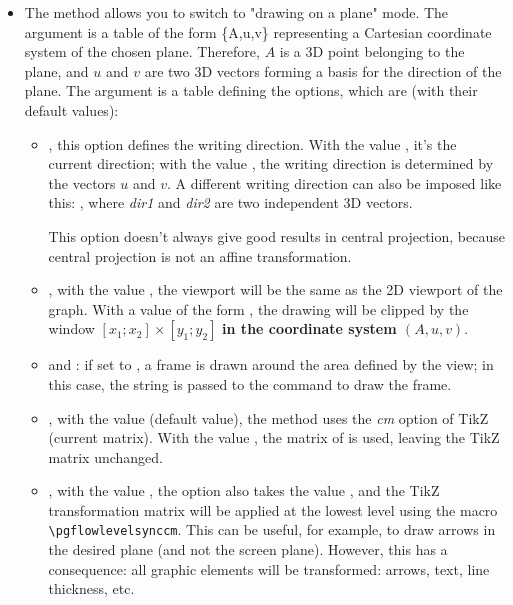 \begin{itemize}
    \item The method  allows you to switch to "drawing on a plane" mode. The argument  is a table of the form \{A,u,v\} representing a Cartesian coordinate system of the chosen plane. Therefore, $A$ is a 3D point belonging to the plane, and $u$ and $v$ are two 3D vectors forming a basis for the direction of the plane. The argument  is a table defining the options, which are (with their default values):
    \begin{itemize}
        \item {}, this option defines the writing direction. With the value \nil, it's the current direction; with the value , the writing direction is determined by the vectors $u$ and $v$. A different writing direction can also be imposed like this: , where \emph{dir1} and \emph{dir2} are two independent 3D vectors.

        This option doesn't always give good results in central projection, because central projection is not an affine transformation.

        \item {}, with the value \nil, the viewport will be the same as the 2D viewport of the graph. With a value of the form , the drawing will be clipped by the window $[x_1;x_2]\times[y_1;y_2]$ \textbf{in the coordinate system $(A,u,v)$}.
        
        \item {} and : if set to \true, a frame is drawn around the area defined by the view; in this case, the  string is passed to the \drawcmd command to draw the frame.
        
        \item {}, with the value \true (default value), the method uses the \emph{cm} option of TikZ (current matrix). With the value \false, the matrix of \luadrawenv is used, leaving the TikZ matrix unchanged.

        \item {}, with the value \true, the  option also takes the value \true, and the TikZ transformation matrix will be applied at the lowest level using the macro \verb|\pgflowlevelsynccm|. This can be useful, for example, to draw arrows in the desired plane (and not the screen plane). However, this has a consequence: all graphic elements will be transformed: arrows, text, line thickness, etc.
            

\end{itemize}
\end{itemize}
